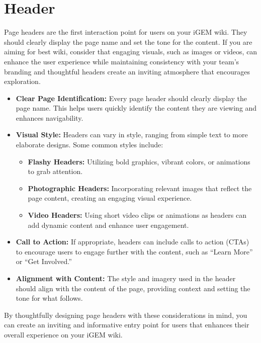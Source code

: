 \section{Header}\label{sec:header} 
Page headers are the first interaction point for users on your iGEM wiki.
They should clearly display the page name and set the tone for the content.
If you are aiming for best wiki, consider that engaging visuals, such as images or videos, can enhance the user experience while maintaining consistency with your team’s branding and thoughtful headers create an inviting atmosphere that encourages exploration.


\begin{itemize}
    \item \textbf{Clear Page Identification:}
    Every page header should clearly display the page name.
    This helps users quickly identify the content they are viewing and enhances navigability.

    \item \textbf{Visual Style:}
    Headers can vary in style, ranging from simple text to more elaborate designs.
    Some common styles include:
    \begin{itemize}
        \item \textbf{Flashy Headers:} Utilizing bold graphics, vibrant colors, or animations to grab attention.
        \item \textbf{Photographic Headers:} Incorporating relevant images that reflect the page content, creating an engaging visual experience.
        \item \textbf{Video Headers:} Using short video clips or animations as headers can add dynamic content and enhance user engagement.
    \end{itemize}

    \item \textbf{Call to Action:}
    If appropriate, headers can include calls to action (CTAs) to encourage users to engage further with the content, such as ``Learn More'' or ``Get Involved.''

    \item \textbf{Alignment with Content:}
    The style and imagery used in the header should align with the content of the page, providing context and setting the tone for what follows.
\end{itemize}
By thoughtfully designing page headers with these considerations in mind, you can create an inviting and informative entry point for users that enhances their overall experience on your iGEM wiki.


